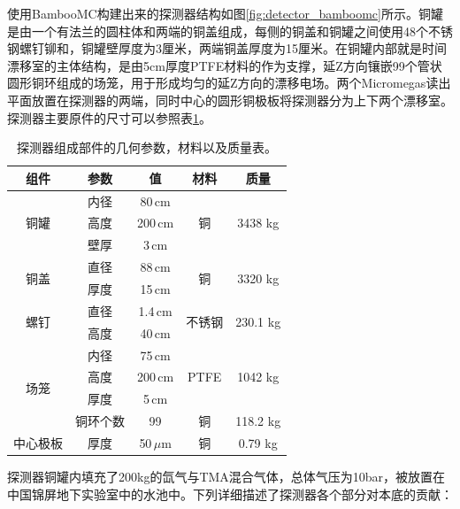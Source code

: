 使用BambooMC构建出来的探测器结构如图\ref{fig:detector_bamboomc}所示。铜罐是由一个有法兰的圆柱体和两端的铜盖组成，每侧的铜盖和铜罐之间使用48个不锈钢螺钉铆和，铜罐壁厚度为3厘米，两端铜盖厚度为15厘米。在铜罐内部就是时间漂移室的主体结构，是由5cm厚度PTFE材料的作为支撑，延Z方向镶嵌99个管状圆形铜环组成的场笼，用于形成均匀的延Z方向的漂移电场。两个Micromegas读出平面放置在探测器的两端，同时中心的圆形铜极板将探测器分为上下两个漂移室。探测器主要原件的尺寸可以参照表\ref{tab:parameters_geometry}。
\begin{table}[thb]
    \begin{center}
        \begin{tabular*}{0.75\textwidth}{@{\extracolsep{\fill}}ccccc}
        \hline
        \hline
        \textbf{组件} & \textbf{参数} & \textbf{值} & \textbf{材料} & \textbf{质量} \\ \hline
        \multirow{3}{*}{铜罐} & 内径 & 80\,cm & \multirow{3}{*}{铜} & \multirow{3}{*}{3438 kg} \\
                    & 高度 & 200\,cm &  &    \\   
                    & 壁厚 & 3\,cm &  &    \\\hline
        \multirow{2}{*}{铜盖} & 直径 & 88\,cm & \multirow{2}{*}{铜} & \multirow{2}{*}{3320 kg} \\
                    & 厚度 & 15\,cm &  &    \\\hline
        \multirow{2}{*}{螺钉} & 直径 & 1.4\,cm & \multirow{2}{*}{不锈钢} & \multirow{2}{*}{230.1 kg} \\
                    & 高度 & 40\,cm &  &    \\\hline
        \multirow{4}{*}{场笼} & 内径 & 75\,cm & \multirow{3}{*}{PTFE} & \multirow{3}{*}{1042 kg} \\
                    & 高度 & 200\,cm &  & \\ 
                    & 厚度 & 5\,cm &  & \\ 
                    & 铜环个数 & 99 &    \multirow{1}{*}{铜}  & 118.2 kg \\\hline
        中心极板 & 厚度   &   50\,$\mu$m     &   \multirow{1}{*}{铜}  &    0.79 kg   \\   
        \hline
        \hline
        \end{tabular*}
        \caption{探测器组成部件的几何参数，材料以及质量表。\supercite{cdr}}
        \label{tab:parameters_geometry}
    \end{center}
\end{table}
  
探测器铜罐内填充了200kg的氙气与TMA混合气体，总体气压为10bar，被放置在中国锦屏地下实验室中的水池中。下列详细描述了探测器各个部分对本底的贡献：

